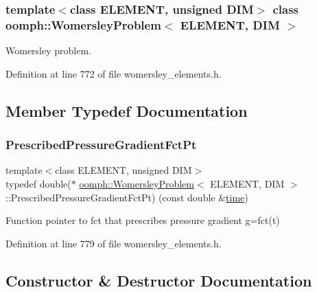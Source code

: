 \subsubsection*{template$<$class E\+L\+E\+M\+E\+NT, unsigned D\+IM$>$\newline
class oomph\+::\+Womersley\+Problem$<$ E\+L\+E\+M\+E\+N\+T, D\+I\+M $>$}

Womersley problem. 

Definition at line 772 of file womersley\+\_\+elements.\+h.



\subsection{Member Typedef Documentation}
\mbox{\label{classoomph_1_1WomersleyProblem_ac3607d12a92dede9ed2e93ae64f300b3}} 
\subsubsection{\texorpdfstring{Prescribed\+Pressure\+Gradient\+Fct\+Pt}{PrescribedPressureGradientFctPt}}
{\footnotesize\ttfamily template$<$class E\+L\+E\+M\+E\+NT, unsigned D\+IM$>$ \\
typedef double($\ast$ \hyperlink{classoomph_1_1WomersleyProblem}{oomph\+::\+Womersley\+Problem}$<$ E\+L\+E\+M\+E\+NT, D\+IM $>$\+::Prescribed\+Pressure\+Gradient\+Fct\+Pt) (const double \&\hyperlink{classoomph_1_1Problem_acd8c357349d20a28af70b2b7ea7f488d}{time})}



Function pointer to fct that prescribes pressure gradient g=fct(t) 



Definition at line 779 of file womersley\+\_\+elements.\+h.



\subsection{Constructor \& Destructor Documentation}
\mbox{\label{classoomph_1_1WomersleyProblem_aa3b907c22d24bd76659a2f7c3b35c91a}} 
